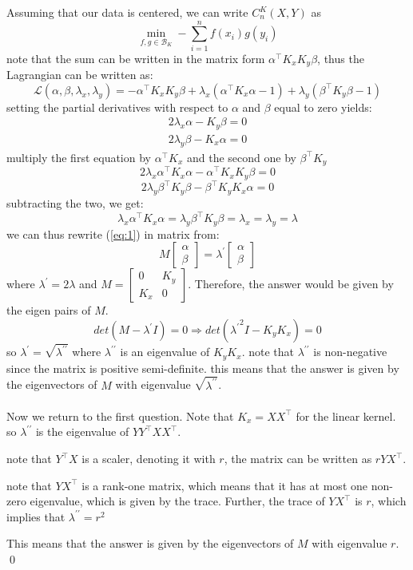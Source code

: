 \documentclass[12pt]{article}
\begin{document}
\begin{bx}
		Assuming that our data is centered, we can write $C_n^K(X,Y)$ as
		\[
		\min\limits_{f,g\in\mathcal{B}_K}-\sum_{i=1}^{n}f(x_i)g(y_i)
		\]
		note that the sum can be written in the matrix form $\alpha^\top K_xK_y\beta$, thus the Lagrangian can be written as:
		$$
		\mathcal{L}(\alpha,\beta,\lambda_x,\lambda_y)=
		-\alpha^\top K_xK_y\beta+\lambda_x(\alpha^\top K_x\alpha-1)+\lambda_y(\beta^\top K_y\beta-1)
		$$
		setting the partial derivatives with respect to $\alpha$ and $\beta$ equal to zero yields:
		\begin{align}\label{eq:1}
		2\lambda_x \alpha - K_y\beta=0  \nonumber \\
		2\lambda_y \beta - K_x\alpha=0
		\end{align}
multiply the first equation by $\alpha^\top K_x$ and the second one by $\beta^\top K_y$
\[
2\lambda_x \alpha^\top K_x\alpha - \alpha^\top K_xK_y\beta =0
\]
\[
2\lambda_y \beta^\top K_y\beta - \beta^\top K_yK_x\alpha =0
\]
	subtracting the two, we get:
	\[
	\lambda_x \alpha^\top K_x\alpha = \lambda_y \beta^\top K_y\beta=\lambda_x=\lambda_y=\lambda
	\]
	we can thus rewrite (\ref{eq:1}) in matrix from:
	\[
	M
\begin{bmatrix}
	\alpha \\
	\beta
\end{bmatrix} = 
\lambda^\prime\begin{bmatrix}
	\alpha \\
	\beta
\end{bmatrix}
	\]
	where $\lambda^\prime=2\lambda$ and $M=\begin{bmatrix}
		0& K_y \\
		K_x& 0
	\end{bmatrix}$. Therefore, the answer would be given by the eigen pairs of $M$.
\[
det(M-\lambda^\prime I)=0 \Rightarrow det({\lambda^\prime}^2I-K_yK_x)=0
\]
so $\lambda^\prime=\sqrt{\lambda^{\prime\prime}}$ where $\lambda^{\prime\prime}$ is an eigenvalue of $K_yK_x$. note that $\lambda^{\prime\prime}$ is non-negative since the matrix is positive semi-definite. this means that the answer is given by the eigenvectors of $M$ with eigenvalue $\sqrt{\lambda^{\prime\prime}}$.
\\ \\
Now we return to the first question. Note that $K_x=XX^\top$ for the linear kernel.
so $\lambda^{\prime\prime}$ is the eigenvalue of $YY^\top XX^\top$.

note that $Y^\top X$ is a scaler, denoting it with $r$, the matrix can be written as $rYX^\top$.

note that $YX^\top$ is a rank-one matrix, which means that it has at most one non-zero eigenvalue, which is given by the trace. Further, the trace of $YX^\top$ is $r$, which implies that $\lambda^{\prime\prime}=r^2$

This means that the answer is given by the eigenvectors of $M$ with eigenvalue $r$.
		\qed
	\end{bx}
	
	
	
\end{document}
